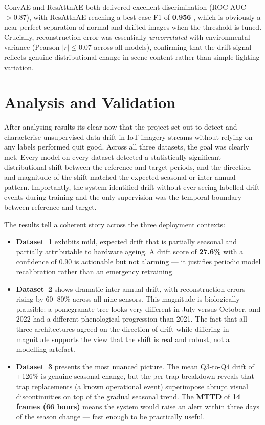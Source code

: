 \documentclass[journal]{IEEEtran} %
\begin{document}
\noindent
ConvAE and ResAttnAE both delivered excellent discrimination (ROC-AUC $> 0.87$), with ResAttnAE reaching a best-case F1 of \textbf{0.956} , which is obviously a near-perfect separation of normal and drifted images when the threshold is tuned. Crucially, reconstruction error was essentially \emph{uncorrelated} with environmental variance (Pearson $|r| \leq 0.07$ across all models), confirming that the drift signal reflects genuine distributional change in scene content rather than simple lighting variation.

\section{Analysis and Validation}

After analysing results its clear now that the project set out to detect and characterise unsupervised data drift in IoT imagery streams without relying on any labels performed quit good. Across all three datasets, the goal was clearly met. Every model on every dataset detected a statistically significant distributional shift between the reference and target periods, and the direction and magnitude of the shift matched the expected seasonal or inter-annual pattern. Importantly, the system identified drift without ever seeing labelled drift events during training and the only supervision was the temporal boundary between reference and target.

The results tell a coherent story across the three deployment contexts:

\begin{itemize}
  \item \textbf{Dataset~1} exhibits mild, expected drift that is partially seasonal
    and partially attributable to hardware ageing.  A drift score of \textbf{27.6\%} with a
    confidence of 0.90 is actionable but not alarming — it justifies periodic
    model recalibration rather than an emergency retraining.

  \item \textbf{Dataset~2} shows dramatic inter-annual drift, with reconstruction
    errors rising by \textbf{$60$–$80\%$} across all nine sensors.  This magnitude is
    biologically plausible: a pomegranate tree looks very different in July versus
    October, and 2022 had a different phenological progression than 2021.  The fact
    that all three architectures agreed on the direction of drift while differing in
    magnitude supports the view that the shift is real and robust, not a modelling
    artefact.

  \item \textbf{Dataset~3} presents the most nuanced picture.  The mean Q3-to-Q4
    drift of +126\% is genuine seasonal change, but the per-trap breakdown reveals
    that trap replacements (a known operational event) superimpose abrupt visual
    discontinuities on top of the gradual seasonal trend.  The \textbf{MTTD} of \textbf{14 frames (66 hours)}
     means the system would raise an alert within three days of the season
    change — fast enough to be practically useful.
\end{itemize}
\end{document}
